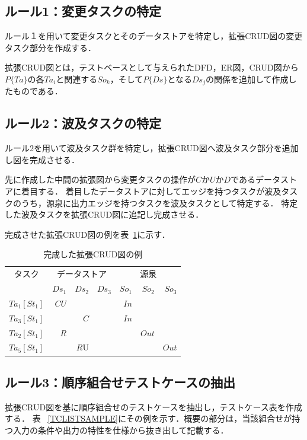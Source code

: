 \documentclass[a4paper,12pt]{jreport}
\begin{document}
\subsection{ルール1：変更タスクの特定}
ルール１を用いて変更タスクとそのデータストアを特定し，拡張CRUD図の変更タスク部分を作成する．

拡張CRUD図とは，テストベースとして与えられたDFD，ER図，CRUD図から$P\{Ta\}$の各$Ta_i$と関連する$So_k$，そして$P\{Ds\}$となる$Ds_j$の関係を追加して作成したものである．


\subsection{ルール2：波及タスクの特定}
ルール2を用いて波及タスク群を特定し，拡張CRUD図へ波及タスク部分を追加し図を完成させる．

先に作成した中間の拡張図から変更タスクの操作が$C$か$U$か$D$であるデータストアに着目する．
着目したデータストアに対してエッジを持つタスクが波及タスクのうち，源泉に出力エッジを持つタスクを波及タスクとして特定する．
特定した波及タスクを拡張CRUD図に追記し完成させる．

完成させた拡張CRUD図の例を表~\ref{excrud}に示す．
\begin{table}[t]
  \centering
  \caption{完成した拡張CRUD図の例}
    \begin{tabular}{r|r|r|r|r|r|r}
    \multicolumn{1}{c|}{タスク} & \multicolumn{3}{c|}{データストア} & \multicolumn{3}{c}{源泉} \\
\cline{2-7}    \multicolumn{1}{c|}{} & $Ds_1$ & $Ds_2$ & $Ds_3$ & $So_1$ & $So_2$ & $So_3$ \\
    \hline
    \hline
    $Ta_1[St_1]$ & $CU$ &   &   & $In$ &   &  \\
    \hline
    $Ta_3[St_1]$ &   & $C$ &   & $In$ &   &  \\
    \hline
    $Ta_2[St_1]$ & $R$ &   &   &   & $Out$ &  \\
    \hline
    $Ta_5[St_1]$ &   & $R$U &   &   &   & $Out$ \\
    \end{tabular}%
  \label{excrud}%
\end{table}%

\subsection{ルール3：順序組合せテストケースの抽出}
拡張CRUD図を基に順序組合せのテストケースを抽出し，テストケース表を作成する．
表 ~\ref{TCLISTSAMPLE}にその例を示す．概要の部分は，当該組合せが持つ入力の条件や出力の特性を仕様から抜き出して記載する．
\end{document}
